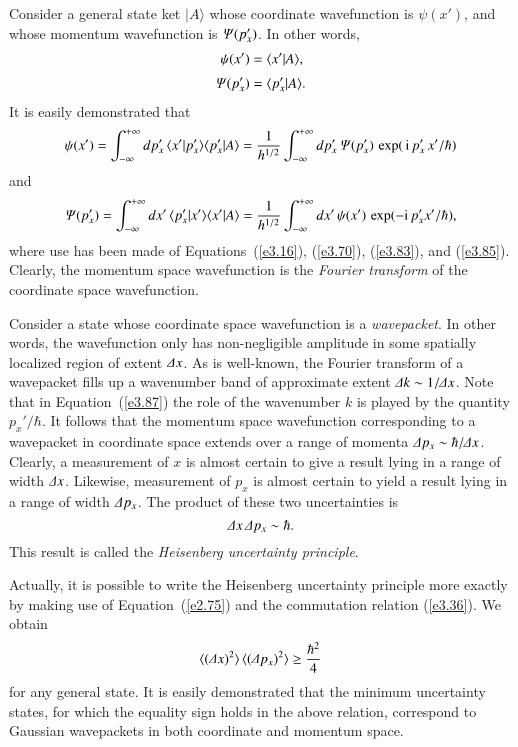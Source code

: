 Consider a general state ket $|A\rangle$ whose coordinate wavefunction is $\psi(x')$,
and whose momentum wavefunction is ${\mit\Psi}(p_x')$. In other words,
\begin{align}
\psi(x') &= \langle x'|A\rangle, \\[0.5ex]
{\mit\Psi}(p_x') &= \langle p_x'|A\rangle.
\end{align}
It is easily demonstrated that
\begin{equation}
\psi(x') = \int_{-\infty}^{+\infty} dp_x'\, \langle x'|p_x'\rangle \langle p_x'|A\rangle
= \frac{1}{h^{1/2}} \int_{-\infty}^{+\infty} dp_x'\,{\mit\Psi}(p_x') \,
\exp(\,{\rm i} \,p_x'\,x'/\hbar)\label{e3.87}
\end{equation}
and 
\begin{equation}
{\mit\Psi}(p_x') = \int_{-\infty}^{+\infty} dx' \,\langle p_x'|x'\rangle \langle x'|A\rangle
=\frac{1}{h^{1/2}} \int_{-\infty}^{+\infty} dx'\,\psi(x')\, \exp(-{\rm i}\, p_x' x'/\hbar),
\end{equation}
where use has been made of Equations~(\ref{e3.16}), (\ref{e3.70}), (\ref{e3.83}), and (\ref{e3.85}). 
Clearly, the momentum
space wavefunction is the {\em Fourier transform}\/
 of the coordinate space wavefunction. 

Consider a state whose coordinate space wavefunction is a {\em wavepacket}. 
In other words, the wavefunction only has non-negligible amplitude in some
spatially localized region of extent ${\mit\Delta} x$. As is well-known, the Fourier
transform of a wavepacket fills up a wavenumber band of approximate extent
${\mit\Delta} k \sim 1/{\mit\Delta} x$. Note that in Equation~(\ref{e3.87}) the role of the wavenumber
$k$ is played by the quantity $p_x'/\hbar$. It follows that the momentum space
wavefunction corresponding to a wavepacket in coordinate space extends over
a range of momenta ${\mit\Delta} p_x \sim \hbar /{\mit\Delta} x$. Clearly, a measurement 
of $x$ is almost certain to give a result lying in a
range of width ${\mit\Delta} x$. Likewise, measurement of $p_x$ is almost certain to
yield a result lying in a range of width ${\mit\Delta} p_x$. The product of these two
uncertainties is 
\begin{equation}
{\mit\Delta} x \,{\mit\Delta} p_x \sim \hbar.
\end{equation}
This result is called the {\em Heisenberg uncertainty principle}. 

Actually, it is possible to write the Heisenberg uncertainty principle
 more exactly by making use of
Equation~(\ref{e2.75}) and the commutation relation (\ref{e3.36}). We obtain
\begin{equation}
\langle ({\mit\Delta} x)^2\rangle \,\langle ({\mit\Delta} p_x)^2\rangle \geq \frac{\hbar^2}{4}
\end{equation}
for any general state. It is easily demonstrated that the minimum uncertainty states,
for which the equality sign holds in the above relation, correspond to Gaussian
wavepackets in both coordinate and momentum space. 

